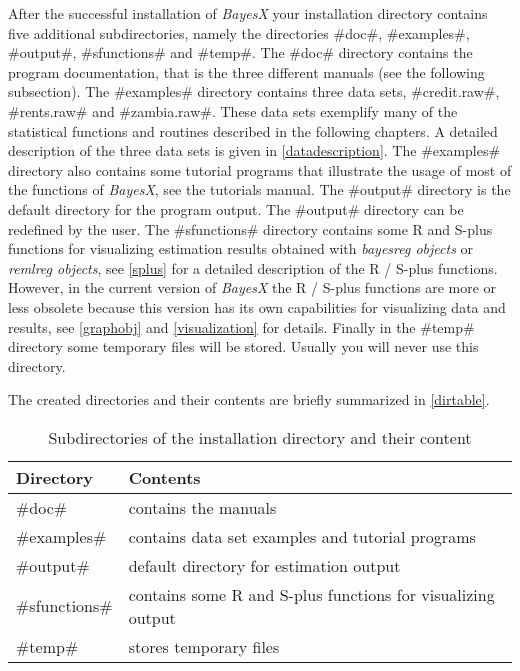 After the successful installation of {\em BayesX} your installation
directory contains five additional subdirectories, namely the
directories #doc#, #examples#, #output#, #sfunctions# and #temp#.
The #doc# directory contains the program documentation, that is the
three different manuals (see the following subsection). The
#examples# directory contains three data sets, #credit.raw#,
#rents.raw# and #zambia.raw#. These data sets exemplify many of the
statistical functions and routines described in the following
chapters. A detailed description of the three data sets is given in
\autoref{datadescription}. The #examples# directory also contains
some tutorial programs that illustrate the usage of most of the
functions of {\em BayesX}, see the tutorials manual. The #output#
directory is the default directory for the program output. The
#output# directory can be redefined by the user. The #sfunctions#
directory contains some R and S-plus functions for visualizing
estimation results obtained with {\em bayesreg objects} or {\em
remlreg objects}, see \autoref{splus} for a detailed description of
the R / S-plus functions. However, in the current version of {\em
BayesX} the R / S-plus functions are more or less obsolete because
this version has its own capabilities for visualizing data and
results, see \autoref{graphobj} and \autoref{visualization} for
details. Finally in the #temp# directory some temporary files will
be stored. Usually you will never use this directory.

The created directories and their contents are briefly summarized
in \autoref{dirtable}.

\begin{table}[ht]
\begin{center}
\begin{tabular}{|l|l|}
\hline
Directory & Contents \\
\hline
#doc# & contains the manuals \\
#examples# & contains data set examples and tutorial programs \\
#output# & default directory for estimation output \\
#sfunctions# & contains some R and S-plus functions for visualizing output \\
#temp# & stores temporary files \\
\hline
\end{tabular}
{\em\caption{ \label{dirtable} Subdirectories of the installation
directory and their content}}
\end{center}
\end{table}

